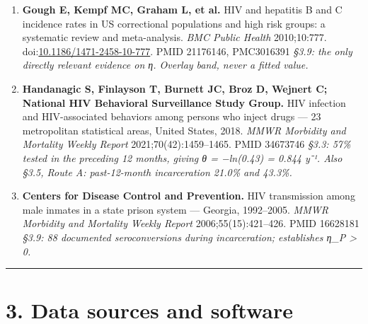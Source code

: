 \begin{enumerate}
  \emph{§3.8: catchment demographic stability, ρ ≈ 0.}
\item
  \textbf{Gough E, Kempf MC, Graham L, et al.} HIV and hepatitis B and C incidence rates in US correctional populations and high risk groups: a systematic review and meta-analysis. \emph{BMC Public Health} 2010;10:777. doi:\href{https://doi.org/10.1186/1471-2458-10-777}{10.1186/1471-2458-10-777}. PMID 21176146, PMC3016391
  \emph{§3.9: the only directly relevant evidence on η. Overlay band, never a fitted value.}
\item
  \textbf{Handanagic S, Finlayson T, Burnett JC, Broz D, Wejnert C; National HIV Behavioral Surveillance Study Group.} HIV infection and HIV-associated behaviors among persons who inject drugs --- 23 metropolitan statistical areas, United States, 2018. \emph{MMWR Morbidity and Mortality Weekly Report} 2021;70(42):1459--1465. PMID 34673746
  \emph{§3.3: 57\% tested in the preceding 12 months, giving θ = −ln(0.43) = 0.844 y⁻¹. Also §3.5, Route A: past-12-month incarceration 21.0\% and 43.3\%.}
\item
  \textbf{Centers for Disease Control and Prevention.} HIV transmission among male inmates in a state prison system --- Georgia, 1992--2005. \emph{MMWR Morbidity and Mortality Weekly Report} 2006;55(15):421--426. PMID 16628181
  \emph{§3.9: 88 documented seroconversions during incarceration; establishes η\_P \textgreater{} 0.}
\end{enumerate}

\begin{center}\rule{0.5\linewidth}{0.5pt}\end{center}

\section{3. Data sources and software}

